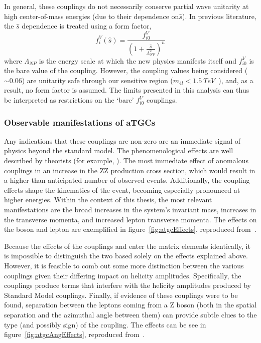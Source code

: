 In general, these couplings do not necessarily conserve partial wave unitarity
at high center-of-mass energies (due to their dependence on$\hat s$). In
previous literature, the $\hat s$ dependence is treated using a form factor,
\begin{equation*} 
    f_i^V(\hat s) = \frac{f_{i0}^V}{\left(1+\frac{\hat s}{\Lambda^2_{NP}}\right)^n}
\end{equation*}
where $\Lambda_{NP}$ is the energy scale at which the new physics manifests
itself and $f_{i0}^V$ is the bare value of the coupling. However, the coupling
values being considered ($\sim0.06$) are unitarity safe through our sensitive
region ($m_{4l} < 1.5~TeV$~\cite{zralek}), and, as a result, no form factor is
assumed. The limits presented in this analysis can thus be interpreted as
restrictions on the `bare' $f_{i0}^V$ couplings.

\subsubsection{Observable manifestations of aTGCs} 
Any indications that these couplings are non-zero are an immediate signal of
physics beyond the standard model. The phenomenological effects are well
described by theorists (for example, \cite{Baur:2000vi}).  The most immediate
effect of anomalous couplings in an increase in the ZZ production cross section,
which would result in a higher-than-anticipated number of observed events.
Additionally, the coupling effects shape the kinematics of the event, becoming
especially pronounced at higher energies. Within the context of this thesis, the
most relevant manifestations are the broad increases in the system's invariant
mass, increases in the \Z transverse momenta, and increased lepton transverse
momenta. The effects on the boson and lepton are exemplified in
figure~\ref{fig:atgcEffects}, reproduced from~\cite{Baur:2000vi}.

Because the effects of the couplings \ffour and \ffive enter the matrix elements
identically, it is impossible to distinguish the two based solely on the effects
explained above. However, it is feasible to comb out some more distinction
between the various couplings given their differing impact on helicity
amplitudes. Specifically, the \ffive couplings produce terms that interfere with
the helicity amplitudes produced by Standard Model couplings. Finally, if
evidence of these couplings were to be found, separation between the leptons
coming from a Z boson (both in the spatial separation and the azimuthal angle
between them) can provide subtle clues to the type (and possibly sign) of the
coupling. The effects can be see in figure~\ref{fig:atgcAngEffects}, reproduced
from~\cite{Baur:2000vi}.

